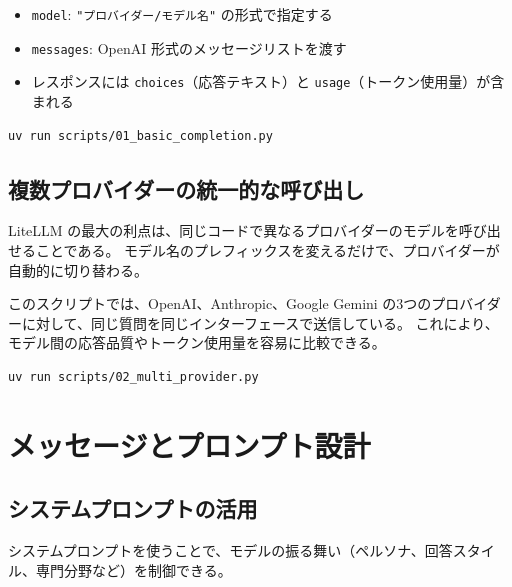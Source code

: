 \documentclass[a4paper,11pt]{ltjsarticle}
\newcommand{\code}[1]{\texttt{#1}}
\begin{document}
\begin{itemize}
  \item \code{model}: \code{"プロバイダー/モデル名"} の形式で指定する
  \item \code{messages}: OpenAI 形式のメッセージリストを渡す
  \item レスポンスには \code{choices}（応答テキスト）と \code{usage}（トークン使用量）が含まれる
\end{itemize}

\begin{lstlisting}[style=bash]
uv run scripts/01_basic_completion.py
\end{lstlisting}

\subsection{複数プロバイダーの統一的な呼び出し}
\label{subsec:multi_provider}

LiteLLM の最大の利点は、同じコードで異なるプロバイダーのモデルを呼び出せることである。
モデル名のプレフィックスを変えるだけで、プロバイダーが自動的に切り替わる。



このスクリプトでは、OpenAI、Anthropic、Google Gemini の3つのプロバイダーに対して、同じ質問を同じインターフェースで送信している。
これにより、モデル間の応答品質やトークン使用量を容易に比較できる。

\begin{lstlisting}[style=bash]
uv run scripts/02_multi_provider.py
\end{lstlisting}


\section{メッセージとプロンプト設計}
\label{sec:messages}

\subsection{システムプロンプトの活用}
\label{subsec:system_prompt}

システムプロンプトを使うことで、モデルの振る舞い（ペルソナ、回答スタイル、専門分野など）を制御できる。


\end{document}
